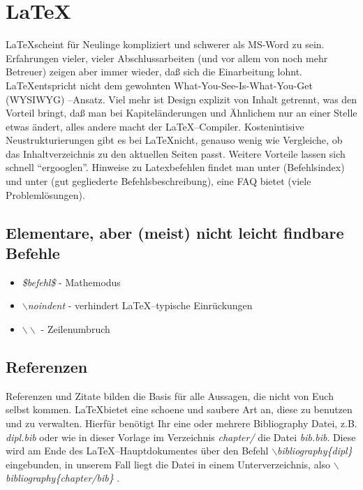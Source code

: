 \section{\LaTeX}
\LaTeX scheint für Neulinge kompliziert und schwerer als MS-Word zu sein. Erfahrungen vieler, vieler Abschlussarbeiten (und vor allem von noch mehr Betreuer) zeigen aber immer wieder, daß sich die Einarbeitung lohnt. \LaTeX entspricht nicht dem gewohnten What-You-See-Is-What-You-Get (WYSIWYG) --Ansatz. Viel mehr ist Design explizit von Inhalt getrennt, was den Vorteil bringt, daß man bei Kapiteländerungen und Ähnlichem nur an einer Stelle etwas ändert, alles andere macht der \LaTeX --Compiler. Kostenintisive Neustrukturierungen gibt es bei \LaTeX nicht, genauso wenig wie Vergleiche, ob das Inhaltverzeichnis zu den aktuellen Seiten passt. Weitere Vorteile lassen sich schnell ``ergooglen''. Hinweise zu Latexbefehlen findet man unter \cite{latexindex} (Befehlsindex) und unter \cite{latexcookbook} (gut gegliederte Befehlsbeschreibung), eine FAQ bietet \cite{dante} (viele Problemlösungen).

\subsection{Elementare, aber (meist) nicht leicht findbare Befehle}
\begin{itemize}
\item {\em \$befehl\$} - Mathemodus\\
\item {\em {$\backslash$}noindent} - verhindert \LaTeX --typische Einrückungen\\
\item {\em {$\backslash\backslash$}} - Zeilenumbruch\\
\end{itemize}
\subsection{Referenzen}
Referenzen und Zitate bilden die Basis für alle Aussagen, die nicht von Euch selbst kommen. \LaTeX bietet eine schoene und saubere Art an, diese zu benutzen und zu verwalten. Hierfür benötigt Ihr eine oder mehrere Bibliography Datei, z.B. {\em dipl.bib} oder wie in dieser Vorlage im Verzeichnis {\em chapter/} die Datei {\em bib.bib}. Diese wird am Ende des \LaTeX --Hauptdokumentes  über den Befehl {\em {$\backslash$}bibliography\{dipl\} } eingebunden, in unserem Fall liegt die Datei in einem Unterverzeichnis, also {\em {$\backslash$}bibliography\{chapter{\slash}bib\} }.

